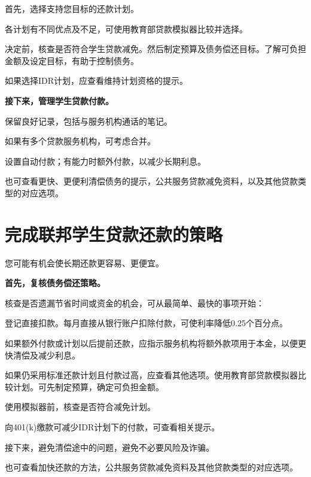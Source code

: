 \documentclass[UTF8,fontset=none,11pt,a4paper]{ctexart}
\begin{document}
首先，选择支持您目标的\allowbreak\mbox{还款计划。}


各计划有不同优点及不足，可使用教育部贷款模拟器比\allowbreak\mbox{较并选择。}


决定前，核查是否符合学生贷款减免。然后制定预算及债务偿还目标。了解可负担金额及设定目标，有助于\allowbreak\mbox{控制债务。}


如果选择IDR计划，应查看维持计划资\allowbreak\mbox{格的提示。}


\textbf{接下来，管理学生贷款付款。}


保留良好记录，包括与服务机构通\allowbreak\mbox{话的笔记。}


如果有多个贷款服务机构，可\allowbreak\mbox{考虑合并。}


设置自动付款；有能力时额外付款，以减少\allowbreak\mbox{长期利息。}


也可查看更快、更便利清偿债务的提示，公共服务贷款减免资料，以及其他贷款类型的\allowbreak\mbox{对应选项。}


\section*{完成联邦学生贷款还款的策略}
您可能有机会使长期还款更容易、更便宜。


\textbf{首先，复核债务偿还策略。}


核查是否遗漏节省时间或资金的机会，可从最简单、最快的\allowbreak\mbox{事项开始：}


登记直接扣款。每月直接从银行账户扣除付款，可使利率降低0.25\allowbreak\mbox{个百分点。}


如果额外付款或计划以后提前还款，应指示服务机构将额外款项用于本金，以便更快清偿及\allowbreak\mbox{减少利息。}


如果仍采用标准还款计划且付款过高，应查看其他选项。使用教育部贷款模拟器比较计划。可先制定预算，确定可\allowbreak\mbox{负担金额。}


使用模拟器前，核查是否符合\allowbreak\mbox{减免计划。}


向401(k)缴款可减少IDR计划下的付款，可查看\allowbreak\mbox{相关提示。}


接下来，避免清偿途中的问题，避免不必要风\allowbreak\mbox{险及诈骗。}


也可查看加快还款的方法，公共服务贷款减免资料及其他贷款类型的\allowbreak\mbox{对应选项。}
\end{document}
